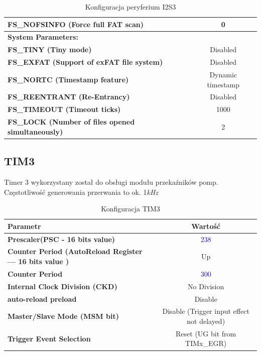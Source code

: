 \documentclass[10pt, a4paper]{article}
\begin{document}
\begin{table}[H]
\begin{tabular}{|l|c|}
\hline  \textbf{FS{\_}NOFSINFO (Force full FAT scan)} &  0\\
\hline  \textbf{System Parameters:} \\
\hline  \textbf{FS{\_}TINY (Tiny mode) } & Disabled\\
\hline  \textbf{FS{\_}EXFAT (Support of exFAT file system)} &  Disabled\\
\hline  \textbf{FS{\_}NORTC (Timestamp feature)} &  Dynamic timestamp\\
\hline  \textbf{FS{\_}REENTRANT (Re-Entrancy)} &  Disabled\\
\hline  \textbf{FS{\_}TIMEOUT (Timeout ticks) } & 1000\\
\hline  \textbf{FS{\_}LOCK (Number of files opened simultaneously)} &  2\\

	
	\hline

	\end{tabular}
	\caption{Konfiguracja peryferium I2S3}
	\label{tab:USART}
\end{table}


\subsection{TIM3}
Timer 3 wykorzystany został do obsługi modułu przekaźników pomp. Częstotliwość generowania przerwania to ok. 1\emph{kHz}
 
\begin{table}[H]
    \centering
    \begin{tabular}{|l|c|} \hline
        \textbf{Parametr} & Wartość \\
        \hline
        \hline  \textbf{Prescaler(PSC - 16 bits value) }& \textcolor{blue}{238} \\
        \hline  \textbf{Counter Period (AutoReload Register --- 16 bits value )} & Up \\
        \hline  \textbf{Counter Period} & \textcolor{blue}{300} \\
        \hline  \textbf{Internal Clock Division (CKD) } & No Division\\
        \hline  \textbf{auto-reload preload} & Disable\\
        \hline  \textbf{Master/Slave Mode (MSM bit) } & Disable (Trigger input effect not delayed)
        \\
    \hline  \textbf{Trigger Event Selection} & Reset (UG bit from TIMx\_EGR)  \\
    \hline
 
    \end{tabular}
    \caption{Konfiguracja TIM3}
    \label{tab:TIM3}
\end{table}
\end{document}
